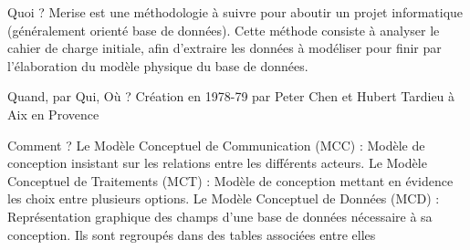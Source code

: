 \documentclass{beamer}
\begin{document}
    \begin{frame}
        Quoi ?
    \newline
    \newline
        Merise est une méthodologie à suivre pour aboutir un projet informatique (généralement orienté base de données).
    \newline
    \newline
        Cette méthode consiste à analyser le cahier de charge initiale,
        afin d'extraire les données à modéliser pour finir par l'élaboration du modèle physique du base de données.
    \end{frame}

    \begin{frame}
        Quand, par Qui, Où ?
        \newline
        \newline
        Création en 1978-79 par Peter Chen et Hubert Tardieu à Aix en Provence
    \end{frame}

    \begin{frame}

        Comment ?
    \newline
    \newline
        Le Modèle Conceptuel de Communication (MCC) :
    \newline
        Modèle de conception insistant sur les relations entre les différents acteurs.
    \newline
    \newline
        Le Modèle Conceptuel de Traitements (MCT) :
    \newline
        Modèle de conception mettant en évidence les choix entre plusieurs options.
    \newline
    \newline
        Le Modèle Conceptuel de Données (MCD) :
    \newline
        Représentation graphique des champs d'une base de données nécessaire à sa conception.
    \newline
        Ils sont regroupés dans des tables associées entre elles

    \end{frame}
\end{document}

